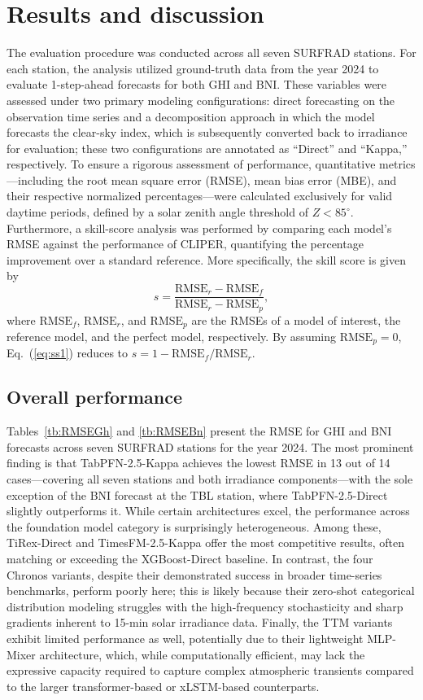\documentclass[number, 3p, 10pt, times]{elsarticle}
\begin{document}
\section{Results and discussion}
The evaluation procedure was conducted across all seven SURFRAD stations. For each station, the analysis utilized ground-truth data from the year 2024 to evaluate 1-step-ahead forecasts for both GHI and BNI. These variables were assessed under two primary modeling configurations: direct forecasting on the observation time series and a decomposition approach in which the model forecasts the clear-sky index, which is subsequently converted back to irradiance for evaluation; these two configurations are annotated as ``Direct'' and ``Kappa,'' respectively. To ensure a rigorous assessment of performance, quantitative metrics---including the root mean square error (RMSE), mean bias error (MBE), and their respective normalized percentages---were calculated exclusively for valid daytime periods, defined by a solar zenith angle threshold of $Z < 85^\circ$. Furthermore, a skill-score analysis was performed by comparing each model's RMSE against the performance of CLIPER, quantifying the percentage improvement over a standard reference. More specifically, the skill score is given by
\begin{equation}
\label{eq:ss1}
    s = \frac{\text{RMSE}_r - \text{RMSE}_f}{\text{RMSE}_r - \text{RMSE}_p},
\end{equation}
where $\text{RMSE}_f$, $\text{RMSE}_r$, and $\text{RMSE}_p$ are the RMSEs of a model of interest, the reference model, and the perfect model, respectively. By assuming $\text{RMSE}_p = 0$, Eq.~(\ref{eq:ss1}) reduces to $s = 1-\text{RMSE}_f/\text{RMSE}_r$. 

\subsection{Overall performance}
Tables~\ref{tb:RMSEGh} and \ref{tb:RMSEBn} present the RMSE for GHI and BNI forecasts across seven SURFRAD stations for the year 2024. The most prominent finding is that TabPFN-2.5-Kappa achieves the lowest RMSE in 13 out of 14 cases---covering all seven stations and both irradiance components---with the sole exception of the BNI forecast at the TBL station, where TabPFN-2.5-Direct slightly outperforms it. While certain architectures excel, the performance across the foundation model category is surprisingly heterogeneous. Among these, TiRex-Direct and TimesFM-2.5-Kappa offer the most competitive results, often matching or exceeding the XGBoost-Direct baseline. In contrast, the four Chronos variants, despite their demonstrated success in broader time-series benchmarks, perform poorly here; this is likely because their zero-shot categorical distribution modeling struggles with the high-frequency stochasticity and sharp gradients inherent to 15-min solar irradiance data. Finally, the TTM variants exhibit limited performance as well, potentially due to their lightweight MLP-Mixer architecture, which, while computationally efficient, may lack the expressive capacity required to capture complex atmospheric transients compared to the larger transformer-based or xLSTM-based counterparts.
\end{document}
